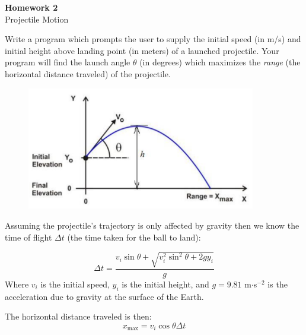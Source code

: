 \documentclass{article}
\begin{document}
\fancyfoot[C]{\thepage}
\vspace*{0cm}
\begin{center}
	{\LARGE \textbf{Homework 2}}\\
	\vspace{.25cm}
	{\Large Projectile Motion}
\end{center}

Write a program which prompts the user to supply the initial speed (in m/s) and initial height above landing point (in meters) of a launched projectile. Your program will find the launch angle $\theta$ (in degrees) which maximizes the \textit{range} (the horizontal distance traveled) of the projectile.

\begin{figure}[ht!]
	\centering
	\includegraphics[width=10cm]{image.png}
\end{figure}

Assuming the projectile's trajectory is only affected by gravity then we know the time of flight $\Delta t$ (the time taken for the ball to land):

\begin{equation}
\Delta t=\frac{v_i\sin{\theta}+\sqrt{v_i^2\sin^2{\theta}+2g y_i }}{g}
\label{tof}
\end{equation}
Where $v_i$ is the initial speed, $y_i$ is the initial height, and $g=9.81$ m$\cdot$s$^{-2}$ is the acceleration due to gravity at the surface of the Earth. 

The horizontal distance traveled is then:
\begin{equation}
x_\mathrm{max}=v_i\cos{\theta}\Delta t
\end{equation}
\end{document}
